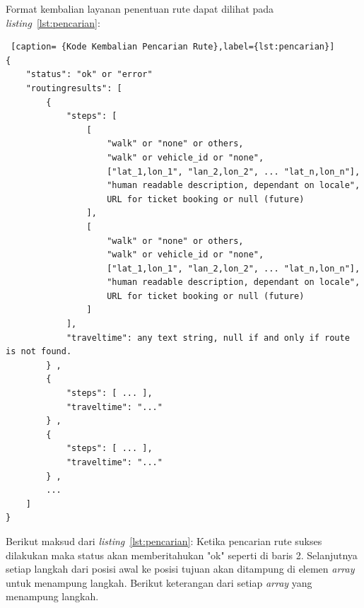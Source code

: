 Format kembalian layanan penentuan rute dapat dilihat pada \textit{listing}~\ref{lst:pencarian}:

\begin{lstlisting} [caption= {Kode Kembalian Pencarian Rute},label={lst:pencarian}]
{ 
    "status": "ok" or "error" 
    "routingresults": [ 
        {
            "steps": [
                [
                    "walk" or "none" or others,
                    "walk" or vehicle_id or "none",
                    ["lat_1,lon_1", "lan_2,lon_2", ... "lat_n,lon_n"],
                    "human readable description, dependant on locale",
                    URL for ticket booking or null (future)
                ],
                [
                    "walk" or "none" or others,
                    "walk" or vehicle_id or "none",
                    ["lat_1,lon_1", "lan_2,lon_2", ... "lat_n,lon_n"],
                    "human readable description, dependant on locale",
                    URL for ticket booking or null (future)
                ]
            ],
            "traveltime": any text string, null if and only if route is not found.
        } ,
        {
            "steps": [ ... ],
            "traveltime": "..."
        } ,
        {
            "steps": [ ... ],
            "traveltime": "..."
        } ,
        ...     
    ]
}
\end{lstlisting}
Berikut maksud dari \textit{listing}~\ref{lst:pencarian}: \newline
\hspace{0.5cm} Ketika pencarian rute sukses dilakukan maka status akan memberitahukan "ok" seperti di baris 2. Selanjutnya setiap langkah dari posisi awal ke posisi tujuan akan ditampung di elemen \textit{array} untuk menampung langkah. Berikut keterangan dari setiap \textit{array} yang menampung langkah. 

